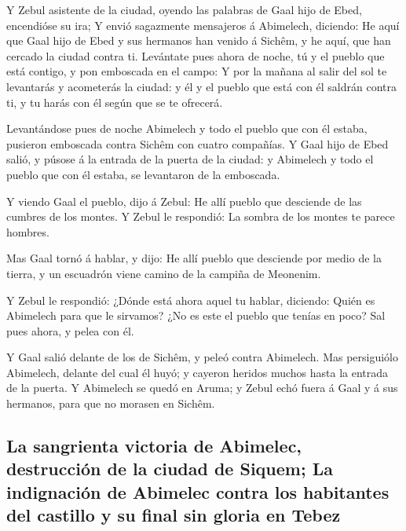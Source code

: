  Y Zebul asistente de la ciudad, oyendo las palabras de
Gaal hijo de Ebed, encendióse su ira;  Y envió sagazmente
mensajeros á Abimelech, diciendo: He aquí que Gaal hijo de Ebed y sus
hermanos han venido á Sichêm, y he aquí, que han cercado la ciudad
contra ti.  Levántate pues ahora de noche, tú y el pueblo
que está contigo, y pon emboscada en el campo:  Y por la
mañana al salir del sol te levantarás y acometerás la ciudad: y él y el
pueblo que está con él saldrán contra ti, y tu harás con él según que se
te ofrecerá.

 Levantándose pues de noche Abimelech y todo el pueblo
que con él estaba, pusieron emboscada contra Sichêm con cuatro
compañías.  Y Gaal hijo de Ebed salió, y púsose á la
entrada de la puerta de la ciudad: y Abimelech y todo el pueblo que con
él estaba, se levantaron de la emboscada.

 Y viendo Gaal el pueblo, dijo á Zebul: He allí pueblo
que desciende de las cumbres de los montes. Y Zebul le respondió: La
sombra de los montes te parece hombres.

 Mas Gaal tornó á hablar, y dijo: He allí pueblo que
desciende por medio de la tierra, y un escuadrón viene camino de la
campiña de Meonenim.

 Y Zebul le respondió: ¿Dónde está ahora aquel tu hablar,
diciendo: Quién es Abimelech para que le sirvamos? ¿No es este el pueblo
que tenías en poco? Sal pues ahora, y pelea con él.

 Y Gaal salió delante de los de Sichêm, y peleó contra
Abimelech.  Mas persiguiólo Abimelech, delante del cual
él huyó; y cayeron heridos muchos hasta la entrada de la puerta.
 Y Abimelech se quedó en Aruma; y Zebul echó fuera á Gaal
y á sus hermanos, para que no morasen en Sichêm.

\hypertarget{la-sangrienta-victoria-de-abimelec-destrucciuxf3n-de-la-ciudad-de-siquem-la-indignaciuxf3n-de-abimelec-contra-los-habitantes-del-castillo-y-su-final-sin-gloria-en-tebez}{%
\subsection{La sangrienta victoria de Abimelec, destrucción de la ciudad
de Siquem; La indignación de Abimelec contra los habitantes del castillo
y su final sin gloria en
Tebez}\label{la-sangrienta-victoria-de-abimelec-destrucciuxf3n-de-la-ciudad-de-siquem-la-indignaciuxf3n-de-abimelec-contra-los-habitantes-del-castillo-y-su-final-sin-gloria-en-tebez}}

